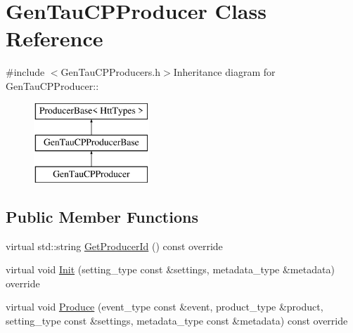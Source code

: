 \hypertarget{classGenTauCPProducer}{
\section{GenTauCPProducer Class Reference}
\label{classGenTauCPProducer}
}


{\ttfamily \#include $<$GenTauCPProducers.h$>$}Inheritance diagram for GenTauCPProducer::\begin{figure}[H]
\begin{center}
\leavevmode
\includegraphics[height=3cm]{classGenTauCPProducer}
\end{center}
\end{figure}
\subsection*{Public Member Functions}
\begin{DoxyCompactItemize}
\item 
virtual std::string \hyperlink{classGenTauCPProducer_a5f0ceea95e75cc2144a2cf05829c9bf5}{GetProducerId} () const override
\item 
virtual void \hyperlink{classGenTauCPProducer_a23653a610d8e1db8666e35c3793d1eb4}{Init} (setting\_\-type const \&settings, metadata\_\-type \&metadata) override
\item 
virtual void \hyperlink{classGenTauCPProducer_a2ae8772bad72e005ac04ec307f6c1ae0}{Produce} (event\_\-type const \&event, product\_\-type \&product, setting\_\-type const \&settings, metadata\_\-type const \&metadata) const override
\end{DoxyCompactItemize}



